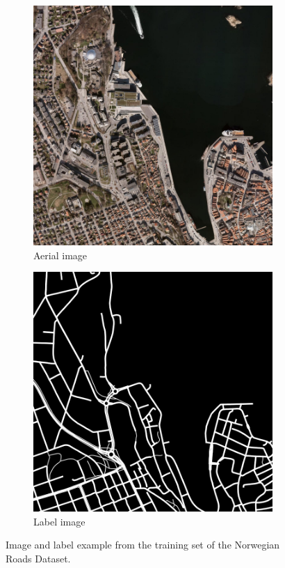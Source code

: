\begin{figure}
\begin{subfigure}{0.40\textwidth}
\includegraphics[width=\linewidth]{figs/background_theory_example_data.png}
\caption{Aerial image} \label{fig:background_dataset_example_data}
\end{subfigure}
\hspace*{\fill} %
\begin{subfigure}{0.40\textwidth}
\includegraphics[width=\linewidth]{figs/background_theory_example_label.png}
\caption{Label image} \label{fig:background_dataset_example_label}
\end{subfigure}
\caption{Image and label example from the training set of the Norwegian Roads Dataset.} \label{fig:background_dataset_example}
\end{figure}

